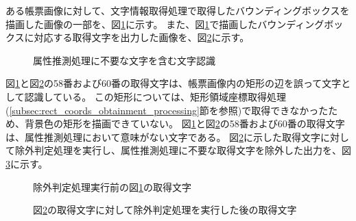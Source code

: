 ある帳票画像に対して、文字情報取得処理で取得したバウンディングボックスを描画した画像の一部を、図\ref{fig:before_exclusion_bbox}に示す。
また、図\ref{fig:before_exclusion_bbox}で描画したバウンディングボックスに対応する取得文字を出力した画像を、図\ref{fig:before_exclusion_string}に示す。
\begin{figure}[tp]
    \begin{center}
        \caption{属性推測処理に不要な文字を含む文字認識}
        \label{fig:before_exclusion_bbox}
    \end{center}
\end{figure}
図\ref{fig:before_exclusion_bbox}と図\ref{fig:before_exclusion_string}の58番および60番の取得文字は、帳票画像内の矩形の辺を誤って文字として認識している。
この矩形については、矩形領域座標取得処理(\ref{subsec:rect_coords_obtainment_processing}節を参照)で取得できなかったため、背景色の矩形を描画できていない。
図\ref{fig:before_exclusion_bbox}と図\ref{fig:before_exclusion_string}の58番および60番の取得文字は、属性推測処理において意味がない文字である。
図\ref{fig:before_exclusion_string}に示した取得文字に対して除外判定処理を実行し、属性推測処理に不要な取得文字を除外した出力を、図\ref{fig:after_exclusion_string}に示す。
\begin{figure}[tp]
    \begin{center}
        \caption{除外判定処理実行前の図\ref{fig:before_exclusion_bbox}の取得文字}
        \label{fig:before_exclusion_string}
    \end{center}
\end{figure}
\begin{figure}[tp]
    \begin{center}
        \caption{図\ref{fig:before_exclusion_string}の取得文字に対して除外判定処理を実行した後の取得文字}
        \label{fig:after_exclusion_string}
    \end{center}
\end{figure}
